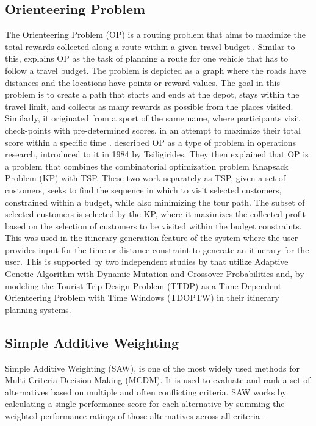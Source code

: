 \subsection{Orienteering Problem}
The Orienteering Problem (OP) is a routing problem that aims to maximize the total rewards collected along a route within a given travel budget \parencite{yu2022}. Similar to this, \textcite{morandi2024} explains OP as the task of planning a route for one vehicle that has to follow a travel budget. The problem is depicted as a graph where the roads have distances and the locations have points or reward values. The goal in this problem is to create a path that starts and ends at the depot, stays within the travel limit, and collects as many rewards as possible from the places visited. Similarly, it originated from a sport of the same name, where participants visit check-points with pre-determined scores, in an attempt to maximize their total score within a specific time \parencite{Lim2019}. \textcite{pvenivcka2019} described OP as a type of problem in operations research, introduced to it in 1984 by Tsiligirides. They then explained that OP is a problem that combines the combinatorial optimization problem Knapsack Problem (KP) with TSP. These two work separately as TSP, given a set of customers, seeks to find the sequence in which to visit selected customers, constrained within a budget, while also minimizing the tour path. The subset of selected customers is selected by the KP, where it maximizes the collected profit based on the selection of customers to be visited within the budget constraints. This was used in the itinerary generation feature of the system where the user provides input for the time or distance constraint to generate an itinerary for the user. This is supported by two independent studies by \textcite{Yochum2020} that utilize Adaptive Genetic Algorithm with Dynamic Mutation and Crossover Probabilities and, \textcite{Tenemaza2020} by modeling the Tourist Trip Design Problem (TTDP) as a Time-Dependent Orienteering Problem with Time Windows (TDOPTW) in their itinerary planning systems.

\subsection{Simple Additive Weighting}

Simple Additive Weighting (SAW), is one of the most widely used methods for Multi-Criteria Decision Making (MCDM). It is used to evaluate and rank a set of alternatives based on multiple and often conflicting criteria. SAW works by calculating a single performance score for each alternative by summing the weighted performance ratings of those alternatives across all criteria \parencite{Hamed2023}.


